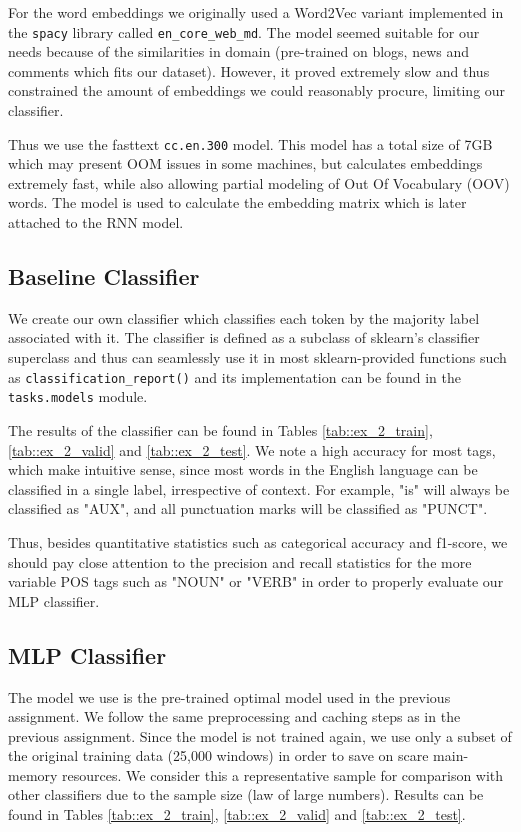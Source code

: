 \documentclass[10pt, a4paper]{article}
\begin{document}
	For the word embeddings we originally used a Word2Vec variant implemented in the \texttt{spacy} library called \texttt{en\_core\_web\_md}. The model seemed suitable for our needs because of the similarities in domain (pre-trained on blogs, news and comments which fits our dataset). However, it proved extremely slow and thus constrained the amount of embeddings we could reasonably procure, limiting our classifier.
	
	Thus we use the fasttext \texttt{cc.en.300} model. This model has a total size of 7GB which may present OOM issues in some machines, but calculates embeddings extremely fast, while also allowing partial modeling of Out Of Vocabulary (OOV) words. The model is used to calculate the embedding matrix which is later attached to the RNN model.
	
	\subsection{Baseline Classifier}
	
	We create our own classifier which classifies each token by the majority label associated with it. The classifier is defined as a subclass of sklearn's classifier superclass and thus can seamlessly use it in most sklearn-provided functions such as \texttt{classification\_report()} and its implementation can be found in the \texttt{tasks.models} module.
	
	The results of the classifier can be found in Tables \ref{tab::ex_2_train}, \ref{tab::ex_2_valid} and \ref{tab::ex_2_test}. We note a high accuracy for most tags, which make intuitive sense, since most words in the English language can be classified in a single label, irrespective of context. For example, "is" will always be classified as "AUX", and all punctuation marks will be classified as "PUNCT".
	
	Thus, besides quantitative statistics such as categorical accuracy and f1-score, we should pay close attention to the precision and recall statistics for the more variable POS tags such as "NOUN" or "VERB" in order to properly evaluate our MLP classifier.
	
	
	\subsection{MLP Classifier}
	
	The model we use is the pre-trained optimal model used in the previous assignment. We follow the same preprocessing and caching steps as in the previous assignment. Since the model is not trained again, we use only a subset of the original training data (25,000 windows) in order to save on scare main-memory resources. We consider this a representative sample for comparison with other classifiers due to the sample size (law of large numbers). Results can be found in Tables \ref{tab::ex_2_train}, \ref{tab::ex_2_valid} and \ref{tab::ex_2_test}.
	
\end{document}
